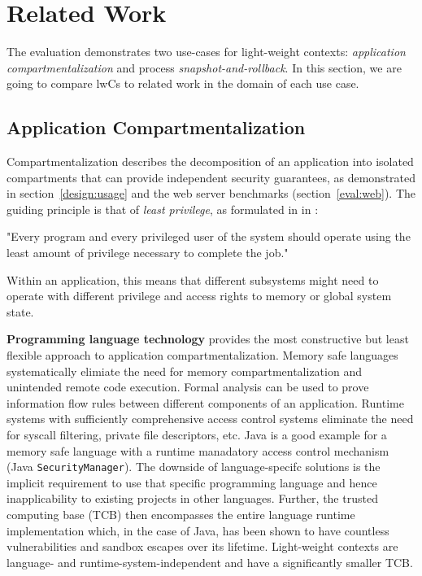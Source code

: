 \documentclass[10pt,twocolumn,letter]{article}
\begin{document}
\section{Related Work}\label{rel}
The evaluation demonstrates two use-cases for light-weight contexts: \textit{application compartmentalization} and process \textit{snapshot-and-rollback}.
In this section, we are going to compare lwCs to related work in the domain of each use case.

\subsection{Application Compartmentalization}
Compartmentalization describes the decomposition of an application into isolated compartments that can provide independent security guarantees, as demonstrated in section~\ref{design:usage} and the web server benchmarks (section~\ref{eval:web}).
The guiding principle is that of \textit{least privilege}, as formulated in \citeyear{principleofleastprivilege} in \cite{principleofleastprivilege}:~%
\begin{displayquote}
"Every program and every privileged user of the system should operate using the least amount of privilege necessary to complete the job."
\end{displayquote}
Within an application, this means that different subsystems might need to operate with different privilege and access rights to memory or global system state.

\textbf{Programming language technology} provides the most constructive but least flexible approach to application compartmentalization.
Memory safe languages systematically elimiate the need for memory compartmentalization and unintended remote code execution.
Formal analysis can be used to prove information flow rules between different components of an application.
Runtime systems with sufficiently comprehensive access control systems eliminate the need for syscall filtering, private file descriptors, etc.
Java is a good example for a memory safe language with a runtime manadatory access control mechanism (Java \lstinline{SecurityManager}).
The downside of language-specifc solutions is the implicit requirement to use that specific programming language and hence inapplicability to existing projects in other languages.
Further, the trusted computing base (TCB) then encompasses the entire language runtime implementation which, in the case of Java, has been shown to have countless vulnerabilities and sandbox escapes over its lifetime.
Light-weight contexts are language- and runtime-system-independent and have a significantly smaller TCB.
\cite{javasecurity,bartel2018twentyyearsjavasecuritysandboxescape}
\end{document}
